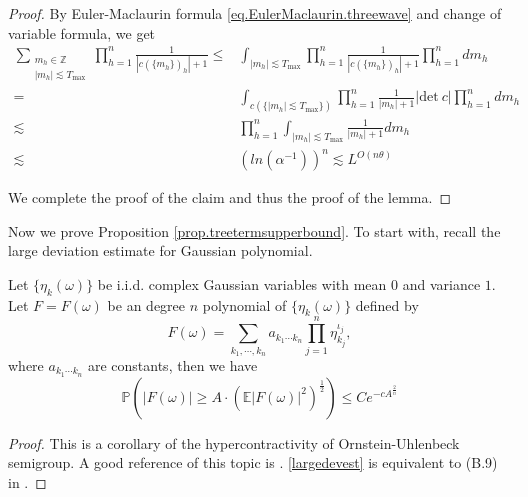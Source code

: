 \begin{proof}
By Euler-Maclaurin formula \eqref{eq.EulerMaclaurin.threewave} and change of variable formula, we get
\begin{equation}
\begin{split}
    \sum_{\substack{m_{h}\in \mathbb{Z}\\ |m_{h}|\lesssim  T_{\text{max}}}} \prod_{h=1}^{n}\frac{1}{|c(\{m_{h}\})_{h}|+1}\le& \int_{|m_{h}|\lesssim  T_{\text{max}}}  \prod_{h=1}^{n}\frac{1}{|c(\{m_{h}\})_{h}|+1}\prod_{h=1}^{n} dm_{h}
    \\
    =& \int_{c(\{|m_{h}|\lesssim  T_{\text{max}}\})}  \prod_{h=1}^{n}\frac{1}{|m_{h}|+1}|\text{det}\ c|\prod_{h=1}^{n}  dm_{h}
    \\
    \lesssim &\prod_{h=1}^{n}\int_{|m_{h}|\lesssim  T_{\text{max}}}  \frac{1}{|m_{h}|+1}  dm_{h}
    \\
    \lesssim & (ln(\alpha^{-1}))^{n}\lesssim L^{O(n\theta)}
\end{split}
\end{equation}

We complete the proof of the claim and thus the proof of the lemma.
\end{proof}

Now we prove Proposition \ref{prop.treetermsupperbound}. To start with, recall the large deviation estimate for Gaussian polynomial.

\begin{lem}\label{lem.largedev}
Let $\{\eta_k(\omega)\}$ be i.i.d. complex Gaussian variables with mean $0$ and variance $1$. Let $F=F(\omega)$ be an degree $n$ polynomial of $\{\eta_k(\omega)\}$ defined by \begin{equation}\label{indp}
F(\omega)=\sum_{k_1,\cdots,k_n}a_{k_1\cdots k_n}\prod_{j=1}^n\eta_{k_j}^{\iota_j},
\end{equation} 
where $a_{k_1\cdots k_n}$ are constants, then we have 
\begin{equation}\label{largedevest}\mathbb{P}\left(|F(\omega)|\geq A\cdot \left(\mathbb{E}|F(\omega)|^2\right)^{\frac{1}{2}}\right)\leq Ce^{-cA^{\frac{2}{n}}}
\end{equation} 
\end{lem}
\begin{proof} This is a corollary of the hypercontractivity of Ornstein-Uhlenbeck semigroup. A good reference of this topic is \cite{oh2015ornstein}. \eqref{largedevest} is equivalent to (B.9) in \cite{oh2015ornstein}.
\end{proof}

